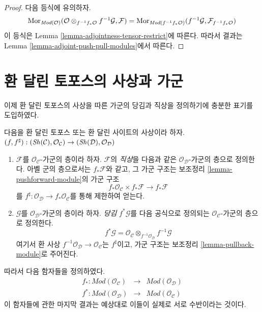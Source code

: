 \begin{proof}
다음 등식에 유의하자.
$$
\mathop{\mathrm{Mor}}\nolimits_{\textit{Mod}(\mathcal{O})}(
\mathcal{O} \otimes_{f^{-1}f_*\mathcal{O}} f^{-1}\mathcal{G}, \mathcal{F})
=
\mathop{\mathrm{Mor}}\nolimits_{\textit{Mod}(f^{-1}f_*\mathcal{O})}(
f^{-1}\mathcal{G}, \mathcal{F}_{f^{-1}f_*\mathcal{O}})
$$
이 등식은 Lemma \ref{lemma-adjointness-tensor-restrict}에 따른다. 따라서
결과는 Lemma \ref{lemma-adjoint-push-pull-modules}에서 따른다.
\end{proof}






\section{환 달린 토포스의 사상과 가군}
\label{section-functoriality-modules}

\noindent
이제 환 달린 토포스의 사상을 따른 가군의 당김과 직상을
정의하기에 충분한 표기를 도입하였다.

\begin{definition}
\label{definition-pushforward}
다음을 환 달린 토포스 또는 환 달린 사이트의 사상이라 하자.
$(f, f^\sharp) :
(\mathop{\mathit{Sh}}\nolimits(\mathcal{C}), \mathcal{O}_\mathcal{C})
\to
(\mathop{\mathit{Sh}}\nolimits(\mathcal{D}), \mathcal{O}_\mathcal{D})$
\begin{enumerate}
\item $\mathcal{F}$를 $\mathcal{O}_\mathcal{C}$-가군의 층이라 하자.
$\mathcal{F}$의 {\it 직상}을 다음과 같은
$\mathcal{O}_\mathcal{D}$-가군의 층으로 정의한다. 아벨 군의 층으로서는
$f_*\mathcal{F}$와 같고, 그 가군 구조는 보조정리
\ref{lemma-pushforward-module}의 가군 구조
$$
f_*\mathcal{O}_\mathcal{C} \times f_*\mathcal{F}
\longrightarrow
f_*\mathcal{F}
$$
를 $f^\sharp : \mathcal{O}_\mathcal{D} \to f_*\mathcal{O}_\mathcal{C}$를
통해 제한하여 얻는다.
\item $\mathcal{G}$를 $\mathcal{O}_\mathcal{D}$-가군의 층이라 하자.
{\it 당김} $f^*\mathcal{G}$를 다음 공식으로 정의되는
$\mathcal{O}_\mathcal{C}$-가군의 층으로 정의한다.
$$
f^*\mathcal{G}
=
\mathcal{O}_\mathcal{C} \otimes_{f^{-1}\mathcal{O}_\mathcal{D}}
f^{-1}\mathcal{G}
$$
여기서 환 사상
$f^{-1}\mathcal{O}_\mathcal{D} \to \mathcal{O}_\mathcal{C}$는
$f^\sharp$이고, 가군 구조는 보조정리
\ref{lemma-pullback-module}로 주어진다.
\end{enumerate}
\end{definition}

\noindent
따라서 다음 함자들을 정의하였다.
\begin{eqnarray*}
f_* : \textit{Mod}(\mathcal{O}_\mathcal{C})
& \longrightarrow &
\textit{Mod}(\mathcal{O}_\mathcal{D}) \\
f^* : \textit{Mod}(\mathcal{O}_\mathcal{D})
& \longrightarrow &
\textit{Mod}(\mathcal{O}_\mathcal{C})
\end{eqnarray*}
이 함자들에 관한 마지막 결과는 예상대로 이들이 실제로 서로
수반이라는 것이다.

